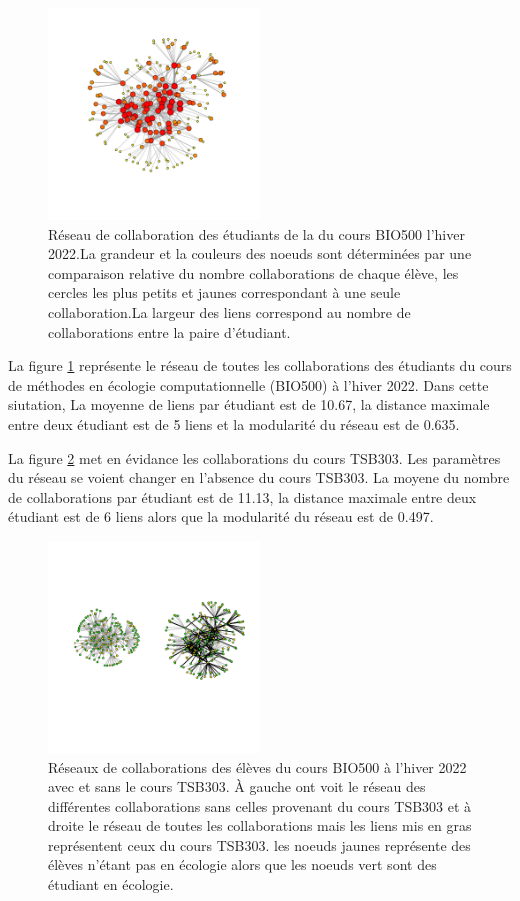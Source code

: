 \documentclass[9pt,twocolumn,twoside,]{pnas-new}
\begin{document}
\begin{figure}
\centering
\includegraphics[width=0.5\textwidth,height=0.4\textheight]{"../results/figure1.png"}
\caption{Réseau de collaboration des étudiants de la du cours BIO500
l'hiver 2022.La grandeur et la couleurs des noeuds sont déterminées par
une comparaison relative du nombre collaborations de chaque élève, les
cercles les plus petits et jaunes correspondant à une seule
collaboration.La largeur des liens correspond au nombre de
collaborations entre la paire d'étudiant. \label{fig:plot1}}
\end{figure}

La figure \ref{fig:plot1} représente le réseau de toutes les
collaborations des étudiants du cours de méthodes en écologie
computationnelle (BIO500) à l'hiver 2022. Dans cette siutation, La
moyenne de liens par étudiant est de 10.67, la distance maximale entre
deux étudiant est de 5 liens et la modularité du réseau est de 0.635.

La figure \ref{fig:plot2} met en évidance les collaborations du cours
TSB303. Les paramètres du réseau se voient changer en l'absence du cours
TSB303. La moyene du nombre de collaborations par étudiant est de 11.13,
la distance maximale entre deux étudiant est de 6 liens alors que la
modularité du réseau est de 0.497.

\begin{figure}
\centering
\includegraphics[width=0.5\textwidth,height=0.4\textheight]{"../results/figure2.png"}
\caption{Réseaux de collaborations des élèves du cours BIO500 à l'hiver
2022 avec et sans le cours TSB303. À gauche ont voit le réseau des
différentes collaborations sans celles provenant du cours TSB303 et à
droite le réseau de toutes les collaborations mais les liens mis en gras
représentent ceux du cours TSB303. les noeuds jaunes représente des
élèves n'étant pas en écologie alors que les noeuds vert sont des
étudiant en écologie.\label{fig:plot2}}
\end{figure}
\end{document}
